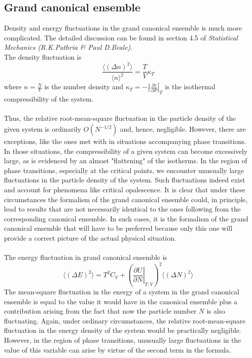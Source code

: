 \subsection{Grand canonical ensemble}
Density and energy fluctuations in the grand canonical ensemble is much more complicated. The detailed discussion can be found in section 4.5 of \emph{Statistical Mechanics (R.K.Pathria \& Paul D.Beale)}. 
\\
The density fluctuation is
\[\frac{\langle (\Delta n)^2 \rangle}{\langle n \rangle^2} = \frac{T}{V}\kappa_T\]
where $ n = \frac{N}{V}$ is the number density and $\kappa_T = -\frac{1}{v} \left. \frac{\partial v}{\partial P} \right|_{T}$ is the isothermal compressibility of the system.
\\ \\
Thus, the relative root-mean-square fluctuation in the particle density of the given system is ordinarily $O(N^{-1/2})$ and, hence, negligible. However, there are exceptions, like the ones met with in situations accompanying phase transitions. In those situations, the compressibility of a given system can become excessively large, as is evidenced by an almost "flattening" of the isotherms. In the region of phase transitions, especially at the critical points, we encounter unusually large fluctuations in the particle density of the system. Such fluctuations indeed exist and account for phenomena like critical opalescence. It is clear that under these circumstances the formalism of the grand canonical ensemble could, in principle, lead to results that are not necessarily identical to the ones following from the corresponding canonical ensemble. In such cases, it is the formalism of the grand canonical ensemble that will have to be preferred because only this one will provide a correct picture of the actual physical situation.
\\ \\
The energy fluctuation in grand canonical ensemble is 
\[\langle (\Delta E)^2 \rangle = T^2C_V + \left(\left. \frac{\partial U}{\partial N} \right|_{T,V} \right)^2 \langle (\Delta N)^2 \rangle\]
The mean-square fluctuation in the energy of a system in the grand canonical ensemble is equal to the value it would have in the canonical ensemble plus a contribution arising from the fact that now the particle number $N$ is also fluctuating. Again, under ordinary circumstances, the relative root-mean-square fluctuation in the energy density of the system would be practically negligible. However, in the region of phase transitions, unusually large fluctuations in the value of this variable can arise by virtue of the second term in the formula.

